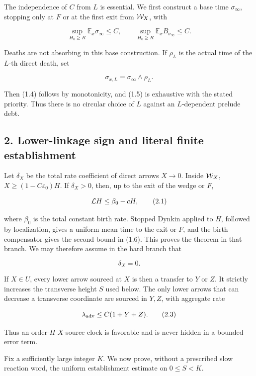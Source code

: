 The independence of \(C\) from \(L\) is essential. We first construct a
base time \(\sigma_\infty\), stopping only at \(F\) or at the first exit
from \({\cal W}_X\), with

\[
 \sup_{H_0\ge R}\mathbb E_x\sigma_\infty\le C,
 \qquad
 \sup_{H_0\ge R}\mathbb E_xB_{\sigma_\infty}\le C.     \tag{1.6}
\]

Deaths are not absorbing in this base construction. If \(\rho_L\) is the
actual time of the \(L\)-th direct death, set

\[
                         \sigma_{x,L}=\sigma_\infty\wedge\rho_L.     \tag{1.7}
\]

Then (1.4) follows by monotonicity, and (1.5) is exhaustive with the
stated priority. Thus there is no circular choice of \(L\) against an
\(L\)-dependent prelude debt.

\subsection{2. Lower-linkage sign and literal finite
establishment}

Let \(\delta_X\) be the total rate coefficient of direct arrows
\(X\to0\). Inside \({\cal W}_X\), \(X\ge(1-C\varepsilon_0)H\). If
\(\delta_X>0\), then, up to the exit of the wedge or \(F\),

\[
                         {\cal L}H\le \beta_0-cH,      \tag{2.1}
\]

where \(\beta_0\) is the total constant birth rate. Stopped Dynkin
applied to \(H\), followed by localization, gives a uniform mean time to
the exit or \(F\), and the birth compensator gives the second bound in
(1.6). This proves the theorem in that branch. We may therefore assume
in the hard branch that

\[
                              \delta_X=0.              \tag{2.2}
\]

If \(X\in U\), every lower arrow sourced at \(X\) is then a transfer to
\(Y\) or \(Z\). It strictly increases the transverse height \(S\) used
below. The only lower arrows that can decrease a transverse coordinate
are sourced in \(Y,Z\), with aggregate rate

\[
                              \lambda_{\rm adv}\le C(1+Y+Z).          \tag{2.3}
\]

Thus an order-\(H\) \(X\)-source clock is favorable and is never hidden
in a bounded error term.

Fix a sufficiently large integer \(K\). We now prove, without a
prescribed slow reaction word, the uniform establishment estimate on
\(0\le S<K\).

